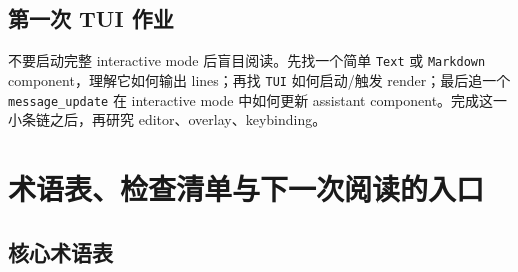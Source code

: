 \documentclass[UTF8,openany,11pt]{ctexbook}
\begin{document}
\section{第一次 TUI 作业}
不要启动完整 interactive mode 后盲目阅读。先找一个简单 \texttt{Text} 或 \texttt{Markdown} component，理解它如何输出 lines；再找 \texttt{TUI} 如何启动/触发 render；最后追一个 \texttt{message\_update} 在 interactive mode 中如何更新 assistant component。完成这一小条链之后，再研究 editor、overlay、keybinding。

\chapter{术语表、检查清单与下一次阅读的入口}

\section{核心术语表}
\end{document}
